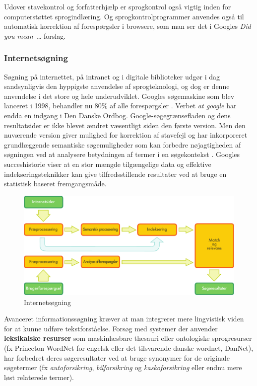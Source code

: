 \begin{multicols}{2}
Udover stavekontrol og forfatterhj\ae lp er sprogkontrol \mbox{ogs\aa} vigtig inden for computerst\o ttet sprogindl\ae ring. Og sprogkontrolprogrammer anvendes \mbox{ogs\aa} til automatisk korrektion af foresp\o rgsler i browsere, som man ser det i Googles {\it Did you mean~\dots}-forslag.


\subsubsection{Internets\o gning}

S\o gning \mbox{p\aa} internettet, \mbox{p\aa} intranet og i digitale bi\-blioteker udg\o r i dag sandsynligvis den hyppigste anvendelse af sprogteknologi, og dog er denne anvendelse i det store og hele underudviklet. Googles s\o gemaskine som blev lanceret i 1998, behandler nu 80\% af alle foresp\o rgsler \cite{spi1}.   Verbet {\it at google} har endda en indgang i Den Danske Ordbog. Google-s\o gegr\ae nsefladen og dens resultatsider er ikke blevet \ae ndret v\ae sentligt siden den f\o rste version. Men den nuv\ae rende version giver mulighed for korrektion af stavefejl og har inkorporeret grundl\ae ggende semantiske s\o gemuligheder som kan forbedre n\o jagtigheden af s\o gningen ved at analysere betydningen af termer i en s\o gekontekst \cite{pc1}.   Googles succeshistorie viser at en stor m\ae ngde tilg\ae ngelige data og effektive indekseringsteknikker kan give tilfredsstillende resultater ved at bruge en statistisk baseret fremgangsm\aa de.

\begin{figure}[htb]
  \center
  \includegraphics[width=\textwidth]{../_media/danish/web_search_architecture}
  \caption{Internetsøgning}
  \label{fig:websearcharch_de}
\end{figure}

Avanceret informationss\o gning kr\ae ver at man inte\-grerer mere lingvistisk viden for at kunne udf\o re tekst\-forst\aa else. Fors\o g med systemer der anvender {\bf leksikalske resurser} som maskinl\ae sbare thesauri eller ontologiske sprogresurser (fx Princeton WordNet for engelsk eller det tilsvarende danske wordnet, DanNet), har forbedret deres s\o geresultater ved at bruge sy\-nonymer for de originale s\o getermer (fx {\it autoforsikring}, {\it bilforsikring} og {\it kaskoforsikring} eller endnu mere l\o st relaterede termer). 


\end{multicols}
